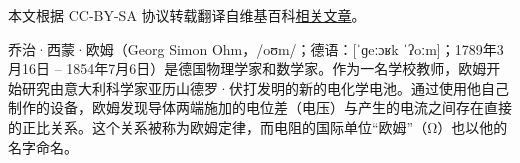 
本文根据 CC-BY-SA 协议转载翻译自维基百科\href{https://en.wikipedia.org/wiki/Georg_Ohm}{相关文章}。


乔治·西蒙·欧姆（Georg Simon Ohm，/oʊm/；德语：[ˈɡeːɔʁk ˈʔoːm]；1789年3月16日 – 1854年7月6日）是德国物理学家和数学家。作为一名学校教师，欧姆开始研究由意大利科学家亚历山德罗·伏打发明的新的电化学电池。通过使用他自己制作的设备，欧姆发现导体两端施加的电位差（电压）与产生的电流之间存在直接的正比关系。这个关系被称为欧姆定律，而电阻的国际单位“欧姆”（Ω）也以他的名字命名。